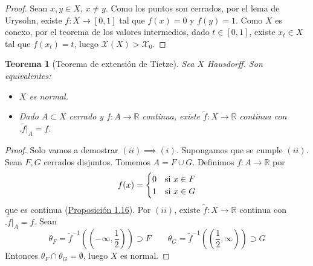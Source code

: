 \documentclass[12pt]{report}
\newtheorem{theorem}{Teorema}[chapter]
\theoremstyle{definition}
\theoremstyle{definition}
\theoremstyle{remark}
\newcommand{\R}{\mathbb R}
\begin{document}
\begin{proof}
Sean $x,y \in X$, $x \neq y$. Como los puntos son cerrados, por el lema de Urysohn, existe $f \colon X \to [0,1]$ tal que $f(x) = 0$ y $f(y) = 1$. Como $X$ es conexo, por el teorema de los valores intermedios, dado $t \in [0,1]$, existe $x_t \in X$ tal que $f(x_t) = t$, luego $\mathcal{X}(X) > \mathcal{X}_0$.
\end{proof}

\begin{theorem}[Teorema de extensión de Tietze]
Sea $X$ Hausdorff. Son equivalentes:
\begin{itemize}
    \item[(i)] $X$ es normal.
    \item[(ii)] Dado $A \subset X$ cerrado y $f \colon A \to \R$ continua, existe $\tilde{f} \colon X \to \R$ continua con $\bigl.\tilde{f}\bigr|_A = f$.
\end{itemize}
\end{theorem}

\begin{proof}
Solo vamos a demostrar $(ii) \implies (i)$. Supongamos que se cumple $(ii)$. Sean $F,G$ cerrados disjuntos. Tomemos $A = F \cup G$. Definimos $f \colon A \to \R$ por
\[
f(x) = 
\begin{cases}
0 & $si$ \ x \in F \\
1 & $si$ \ x \in G
\end{cases}
\]
que es continua (\hyperref[prop1.16.]{\color{blue}Proposición 1.16}). Por $(ii)$, existe $\tilde{f} \colon X \to \R$ continua con $\bigl.\tilde{f}\bigr|_A = f$. Sean 
\[\theta_F = \tilde{f}^{-1}((-\infty,\frac{1}{2})) \supset F \qquad \theta_G = \tilde{f}^{-1}((\frac{1}{2},\infty)) \supset G\]
Entonces $\theta_F \cap \theta_G = \emptyset$, luego $X$ es normal.
\end{proof}
\end{document}
